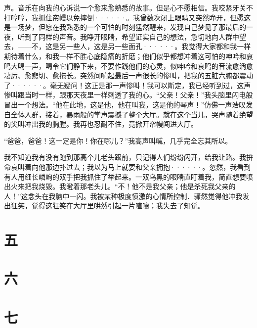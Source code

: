 \documentclass[12pt, UTF8]{ctexbook}
\begin{document}
声。音乐在向我的心诉说一个愈来愈熟悉的故事。但是心不愿相信。我咬紧牙关不打哼哼，我抓住帘幔以免摔倒······。我曾数次闭上眼睛又突然睁开，但愿这是一场梦，但愿在我熟悉的一个可怕的时刻猛然醒来，发现自己梦见了那最后的一夜，听到了同样的声音。我睁开眼睛，希望证实自己的想法，急切地向人群中望去，——不，这是另一些人，这是另一些面孔······。我觉得大家都和我一样期待着什么，和我一样不胜心底隐痛的折磨；他们似乎都想冲着这可怕的呻吟和哀鸣大喝一声，喝令它们静下来，不要作践他们的心灵，似呻吟和哀鸣的音流愈淌愈凄厉、愈悲切、愈拖长。突然间响起最后一声很长的惨叫，把我的五脏六腑都震动了······。毫无疑问！这正是那一声惨叫！我可以断定，我已经听到过，这声惨叫跟当时一样，跟那天夜里一样刺透了我的心。“父亲！父亲！”我头脑里闪电般冒出一个想法。“他在此地，这是他，他在叫我，这是他的琴声！”仿佛一声浩叹发自全体人群，接着，暴雨般的掌声震撼了整个大厅。就在这个当儿，哭声随着绝望的尖叫冲出我的胸膛。我再也忍耐不住，竟掀开帘幔闯进大厅。
\par “爸爸，爸爸！这一定是你！你在哪儿？”我高声叫喊，几乎完全忘其所以。
\par 我不知道我有没有跑到那高个儿老头跟前，只记得人们纷纷闪开，给我让路。我拚命哀叫着向他那边扑过去；我以为马上就要和父亲拥抱······。忽然，我看到有人用细长嶙峋的双手把我抓住了举起来。一双乌黑的眼睛直盯着我，简直想要喷出火来把我烧毁。我瞪着那老头儿。“不！他不是我父亲；他是杀死我父亲的人！”这念头在我脑中一闪。我被某种极度愤激的心情所控制．骤然觉得他冲我发出狂笑，觉得这狂笑在大厅里哄然引起一片喧嚷；我失去了知觉。
\newpage
\section*{五}
\par
\par
\par
\par
\par
\newpage
\section*{六}
\newpage
\section*{七}
\end{document}
